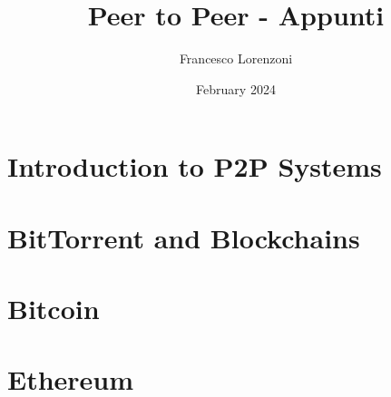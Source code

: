 

\title{Peer to Peer - Appunti}
\author{Francesco Lorenzoni}
\date{February 2024}

\makeatletter
\renewcommand{\l@section}{\@dottedtocline{1}{1.5em}{2.6em}}
\renewcommand{\l@subsection}{\@dottedtocline{2}{2.5em}{3.6em}}
\renewcommand{\l@subsubsection}{\@dottedtocline{3}{3.5em}{4.5em}}
\makeatother
{} %



\doparttoc[n]

\maketitle
\tableofcontents

\part{Introduction to P2P Systems}
\parttoc

% 



\part{BitTorrent and Blockchains}
\parttoc



\part{Bitcoin}
\parttoc





\part{Ethereum}
\parttoc



% 






